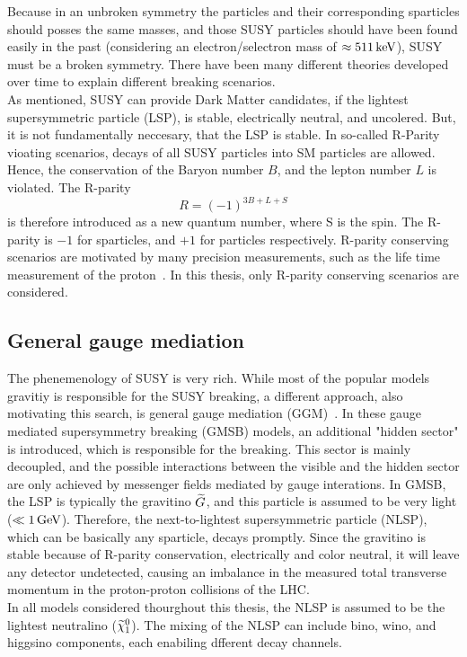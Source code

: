Because in an unbroken symmetry the particles and their corresponding sparticles should posses the same masses, and those SUSY particles should have been found easily in the past (considering \eg an electron/selectron mass of $\approx511\,\text{ke\hspace{-.08em}V}$), SUSY must be a broken symmetry. There have been many different theories developed over time to explain different breaking scenarios.\\
As mentioned, SUSY can provide Dark Matter candidates, if the lightest supersymmetric particle (LSP), is stable, electrically neutral, and uncolered. But, it is not fundamentally neccesary, that the LSP is stable. In so-called R-Parity vioating scenarios, decays of all SUSY particles into SM particles are allowed. Hence, the conservation of the Baryon number $B$, and the lepton number $L$ is violated. The R-parity
\begin{equation}
 R = (-1)^{3B+L+S}
\end{equation}
is therefore introduced as a new quantum number, where S is the spin. The R-parity is $-1$ for sparticles, and $+1$ for particles respectively. R-parity conserving scenarios are motivated by many precision measurements, such as the life time measurement of the proton~\cite{ProtonDecay}.
In this thesis, only R-parity conserving scenarios are considered.\\



\subsection{General gauge mediation}\label{sec:GGM}
The phenemenology of SUSY is very rich. While most of the popular models gravitiy is responsible for the SUSY breaking, a different approach, also motivating this search, is general gauge mediation (GGM)~\cite{GGM}. In these gauge mediated supersymmetry breaking (GMSB) models, an additional "hidden sector" is introduced, which is responsible for the breaking. This sector is mainly decoupled, and the possible interactions between the visible and the hidden sector are only achieved by messenger fields mediated by gauge interations. In GMSB, the LSP is typically the gravitino $\widetilde{G}$, and this particle is assumed to be very light ($\ll1\,\text{Ge\hspace{-.08em}V}$). Therefore, the next-to-lightest supersymmetric particle (NLSP), which can be basically any sparticle, decays promptly. Since the gravitino is stable because of R-parity conservation, electrically and color neutral, it will leave any detector undetected, causing an imbalance in the measured total transverse momentum in \eg the proton-proton collisions of the LHC.\\
In all models considered thourghout this thesis, the NLSP is assumed to be the lightest neutralino ($\widetilde{\chi}^{0}_{1}$). The mixing of the NLSP can include bino, wino, and higgsino components, each enabiling dfferent decay channels.


